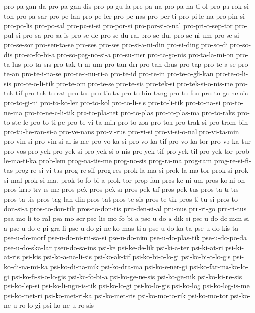 {pro-pa-gan-da pro-pa-gan-dis pro-pa-gu-la pro-pa-na pro-pa-na-ti-ol
pro-pa-rok-si-ton pro-pa-sar pro-pe-lan pro-pe-ler pro-pe-nas pro-per-ti
pro-pi-le-na pro-pin-si pro-po-lis pro-po-sal pro-po-si-si pro-por-si
pro-por-si-o-nal pro-pri-o-sep-tor pro-pul-si pro-sa pro-sa-is pro-se-de
pro-se-du-ral pro-se-dur pro-se-ni-um pro-se-si pro-se-sor pro-sen-ta-se
pro-ses pro-ses pro-si-a-ni-din pro-si-ding pro-so-di pro-so-dis
pro-so-fo-bi-a pro-so-pag-no-si-a pro-su-mer pro-ta-go-nis pro-ta-la-mi-on
pro-ta-lus pro-ta-sis pro-tak-ti-ni-um pro-tan-dri pro-tan-drus pro-tap
pro-te-a-se pro-te-an pro-te-i-na-se pro-te-i-nu-ri-a pro-te-id pro-te-in
pro-te-o-gli-kan pro-te-o-li-sis pro-te-o-li-tik pro-te-om pro-te-se
pro-te-sis pro-tek-si pro-tek-si-o-nis-me pro-tek-tif pro-tek-to-rat
pro-tes pro-tis-ta pro-to-bin-tang pro-to-fon pro-to-ge-ne-sis
pro-to-gi-ni pro-to-ko-ler pro-to-kol pro-to-li-sis pro-to-li-tik
pro-to-na-si pro-to-ne-ma pro-to-ne-o-li-tik pro-to-pla-net pro-to-plas
pro-to-plas-ma pro-to-raks pro-to-ste-le pro-to-ti-pe pro-to-vi-ta-min
pro-to-zoa pro-ton pro-trak-si pro-trom-bin pro-tu-be-ran-si-a pro-ve-nans
pro-vi-rus pro-vi-si pro-vi-si-o-nal pro-vi-ta-min pro-vin-si
pro-vin-si-al-is-me pro-vo-ka-si pro-vo-ka-tif pro-vo-ka-tor pro-vo-ka-tur
pro-vos pro-yek pro-yek-si pro-yek-si-o-nis pro-yek-tif pro-yek-til
pro-yek-tor prob-le-ma-ti-ka prob-lem prog-na-tis-me prog-no-sis
prog-ra-ma prog-ram prog-re-si-fi-tas prog-re-si-vi-tas prog-re-sif
prog-res prok-la-ma-si prok-la-ma-tor prok-si prok-si-mal prok-si-mat
prok-to-fo-bi-a prok-tor prop-fan pros-ke-ni-um pros-ko-ni-on
pros-krip-tiv-is-me pros-pek pros-pek-si pros-pek-tif pros-pek-tus
pros-ta-ti-tis pros-ta-tis pros-tag-lan-din pros-tat pros-te-sis
pros-te-tik pros-ti-tu-si pros-to-don-si-a pros-to-don-tik pros-to-don-tis
pru-den-si-al pru-nus pru-ri-go pru-ri-tus psa-mo-li-to-ral psa-mo-ser
pse-lis-mo-fo-bi-a pse-u-do-a-dik-si pse-u-do-de-men-si-a
pse-u-do-e-pi-gra-fi pse-u-do-gi-ne-ko-mas-ti-a pse-u-do-ka-ta
pse-u-do-kis-ta pse-u-do-morf pse-u-do-ni-mi-sa-si pse-u-do-nim
pse-u-do-plas-tik pse-u-do-po-da pse-u-do-ska-lar pseu-do-sa-ins psi-ke
psi-ke-de-lik psi-ki-a-ter psi-ki-at-ri psi-ki-at-ris psi-kis
psi-ko-a-na-li-sis psi-ko-ak-tif psi-ko-bi-o-lo-gi psi-ko-bi-o-lo-gis
psi-ko-di-na-mi-ka psi-ko-di-na-mik psi-ko-dra-ma psi-ko-e-ner-gi
psi-ko-far-ma-ko-lo-gi psi-ko-fi-si-o-lo-gis psi-ko-fo-bi-a
psi-ko-ge-ne-sis psi-ko-ge-nik psi-ko-ki-ne-sis psi-ko-lep-si
psi-ko-li-ngu-is-tik psi-ko-lo-gi psi-ko-lo-gis psi-ko-log
psi-ko-log-is-me psi-ko-met-ri psi-ko-met-ri-ka psi-ko-met-ris
psi-ko-mo-to-rik psi-ko-mo-tor psi-ko-ne-u-ro-lo-gi psi-ko-ne-u-ro-sis
}
